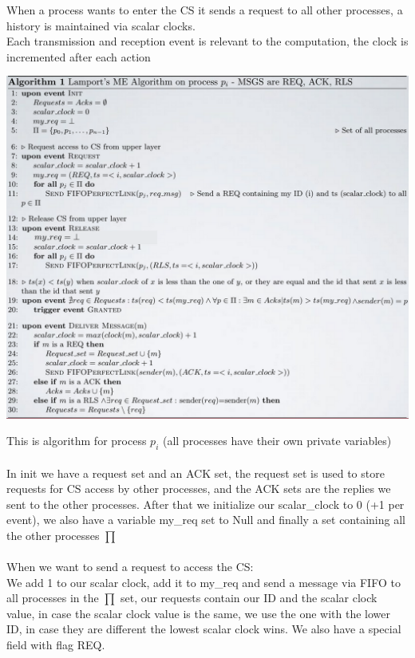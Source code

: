 \documentclass[11pt, a4paper]{article}
\begin{document}
When a process wants to enter the CS it sends a request to all other processes, a history is maintained via scalar clocks.\\
Each transmission and reception event is relevant to the computation, the clock is incremented after each action\\
\begin{center}
    \includegraphics[scale=0.5]{img/mutex/algo.png}
\end{center}
This is algorithm for process $p_i$ (all processes have their own private variables)\\\\
In init we have a request set and an ACK set, the request set is used to store requests for CS access by other processes, and the ACK sets are the replies we sent to the other processes.
After that we initialize our scalar\_clock to 0 (+1 per event), we also have a variable my\_req set to Null and finally a set containing all the other processes $\prod$\\\\
When we want to send a request to access the CS:\\
We add 1 to our scalar clock, add it to my\_req and send a message via FIFO to all processes in the $\prod$ set, our requests contain our ID and the scalar clock value, in case the scalar clock value is the same, we use the one with the lower ID, in case they are different the lowest scalar clock wins. We also have a special field with flag REQ.\\\\
\end{document}
